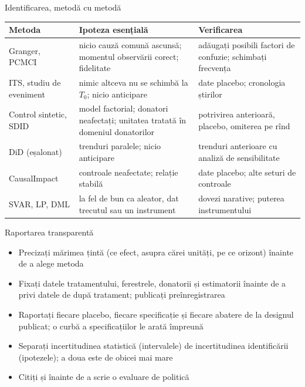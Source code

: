 \begin{frame}{Identificarea, metodă cu metodă}
\itemsize{\small}
\begin{center}
\scriptsize
\begin{tabular}{>{\raggedright\arraybackslash}p{2.6cm}>{\raggedright\arraybackslash}p{5.4cm}>{\raggedright\arraybackslash}p{4.4cm}}
\toprule
\textbf{Metoda} & \textbf{Ipoteza esențială} & \textbf{Verificarea} \\
\midrule
Granger, PCMCI & nicio cauză comună ascunsă; momentul observării corect; fidelitate & adăugați posibili factori de confuzie; schimbați frecvența \\
ITS, studiu de eveniment & nimic altceva nu se schimbă la $T_0$; nicio anticipare & date placebo; cronologia știrilor \\
Control sintetic, SDID & model factorial; donatori neafectați; unitatea tratată în domeniul donatorilor & potrivirea anterioară, placebo, omiterea pe rînd \\
DiD (eșalonat) & trenduri paralele; nicio anticipare & trenduri anterioare cu analiză de sensibilitate \\
CausalImpact & controale neafectate; relație stabilă & date placebo; alte seturi de controale \\
SVAR, LP, DML & la fel de bun ca aleator, dat trecutul sau un instrument & dovezi narative; puterea instrumentului \\
\bottomrule
\end{tabular}
\end{center}
\end{frame}

\begin{frame}{Raportarea transparentă}
\itemsize{\small}
\begin{itemize}
    \item Precizați mărimea țintă (ce efect, asupra cărei unități, pe ce orizont) înainte de a alege metoda
    \item Fixați datele tratamentului, ferestrele, donatorii și estimatorii înainte de a privi datele de după tratament; publicați preînregistrarea
    \item Raportați fiecare placebo, fiecare specificație și fiecare abatere de la designul publicat; o curbă a specificațiilor le arată împreună
    \item Separați incertitudinea statistică (intervalele) de incertitudinea identificării (ipotezele); a doua este de obicei mai mare
    \item Citiți  și  înainte de a scrie o evaluare de politică
\end{itemize}
\end{frame}


